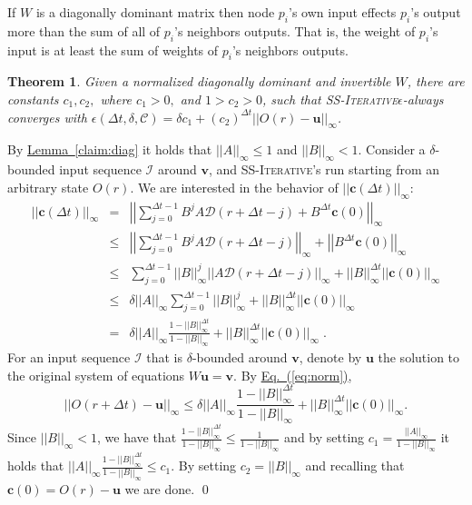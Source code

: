 \documentclass[preprint,12pt]{elsarticle}
\newtheorem{theorem}{Theorem}
\newenvironment{proof}{\noindent{\bf Proof:~~}}{}
\newcommand{\namedref}[2]{\hyperref[#2]{#1~\ref*{#2}}}
\newcommand{\lemmaref}[1]{\namedref{Lemma}{#1}}
\newcommand{\namedrefeq}[2]{\hyperref[#2]{#1~\mbox{\rm(\ref*{#2})}}}
\newcommand{\equationref}[1]{\namedrefeq{Eq.}{#1}}
\newcommand\C{\mathcal{C}}
\newcommand\norm[1]{\left|\left|#1\right|\right|}
\newcommand\normi[1]{\left|\left|#1\right|\right|_\infty}
\newcommand{\syncAlg}{\textsc{SS-Iterative}\xspace}
\newcommand{\uu}{\mathbf{u}}
\newcommand{\vv}{\mathbf{v}}
\newcommand{\cc}{\mathbf{c}}
\newcommand{\D}{\mathcal{D}}
\newcommand{\Or}[1]{O(#1)}
\begin{document}
If $W$ is a diagonally dominant matrix then node $p_i$'s own input effects $p_i$'s output more than the sum of all of $p_i$'s neighbors outputs. That is, the weight of $p_i$'s input is at least the sum of weights of $p_i$'s neighbors outputs.

\begin{theorem}\label{theorem:main}
  Given a normalized diagonally dominant and invertible $W$, there are constants $c_1,c_2,$ where $c_1 > 0,$ and $ 1 > c_2 > 0$,
  such that \syncAlg $\epsilon$-always converges with
  $\epsilon(\Delta t, \delta, \C) = \delta c_1 + (c_2)^{\Delta t} \normi{\Or{r}-\uu}$.
\end{theorem}
\begin{proof}
  By \lemmaref{claim:diag} it holds that $\norm{A}_\infty \leq 1$ and $\norm{B}_\infty <
  1$. Consider a $\delta$-bounded input sequence $\mathcal{I}$ around $\vv$, and
  \syncAlg's run starting from an arbitrary state $\Or{r}$.
  We are interested in the behavior of $\normi{\cc(\Delta t)}$:
\begin{eqnarray}\label{eq:normck}
  \normi{\cc(\Delta t)} & = & \normi{\sum_{j=0}^{\Delta t-1} B^jA\D(r+\Delta t-j) + B^{\Delta t}\cc(0)} \nonumber\\
              & \leq & \normi{\sum_{j=0}^{\Delta t-1} B^jA\D(r+\Delta t-j)} + \normi{B^{\Delta t}\cc(0)} \nonumber\\
              & \leq & \sum_{j=0}^{\Delta t-1} \normi{B}^j\normi{A\D(r+\Delta t-j)} + \normi{B}^{\Delta t}\normi{\cc(0)} \nonumber\\
              & \leq & \delta \normi{A}\sum_{j=0}^{\Delta t-1} \normi{B}^j + \normi{B}^{\Delta t}\normi{\cc(0)} \nonumber \\
              & = & \delta \normi{A} \frac{1-\normi{B}^{\Delta t}}{1-\normi{B}} + \normi{B}^{\Delta t}\normi{\cc(0)}\;.
\end{eqnarray}
For an input sequence $\mathcal{I}$ that is $\delta$-bounded around
$\vv$, denote by $\uu$ the solution to the original system of
equations $W\uu = \vv$. By \equationref{eq:norm},
\begin{equation*}
   \normi{\Or{r+\Delta t}-\uu} \leq \delta \normi{A} \frac{1-\normi{B}^{\Delta t}}{1-\normi{B}} +
  \normi{B}^{\Delta t}\normi{\cc(0)}.
\end{equation*}
  Since $\normi{B} < 1$, we have that
  $\frac{1-\normi{B}^{\Delta t}}{1-\normi{B}}\leq
  \frac{1}{1-\normi{B}}$ and by setting $c_1 =
  \frac{\normi{A}}{1-\normi{B}}$ it holds that $\normi{A}
  \frac{1-\normi{B}^{\Delta t}}{1-\normi{B}} \leq c_1$. By setting $c_2 =
  \normi{B}$ and recalling that $\cc(0) = \Or{r}-\uu$ we are done.
\qed\end{proof}
\end{document}
